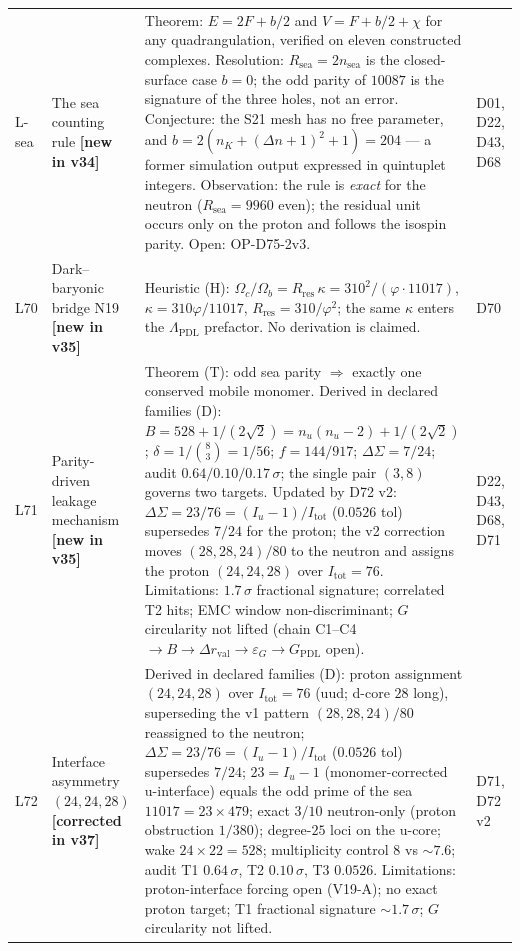 \documentclass[11pt,a4paper]{article}
\newcommand{\Rsea}{R_{\mathrm{sea}}}
\theoremstyle{plain}
\theoremstyle{definition}
\theoremstyle{remark}
\begin{document}
\begin{longtable}{L{0.6cm}L{3.0cm}L{5.5cm}L{4.0cm}}
L-sea & The sea counting rule \textbf{[new in v34]} & \textcolor{proofblue}{Theorem}: $E=2F+b/2$ and $V=F+b/2+\chi$ for any quadrangulation, verified on eleven constructed complexes. \textcolor{proofblue}{Resolution}: $\Rsea=2n_{\mathrm{sea}}$ is the closed-surface case $b=0$; the odd parity of $10087$ is the signature of the three holes, not an error. \textcolor{conjecturegreen}{Conjecture}: the S21 mesh has no free parameter, and $b=2(n_K+(\Delta n+1)^2+1)=204$ --- a former simulation output expressed in quintuplet integers. \textcolor{proofblue}{Observation}: the rule is \emph{exact} for the neutron ($\Rsea=9960$ even); the residual unit occurs only on the proton and follows the isospin parity. Open: OP-D75-2v3. & D01, D22, D43, D68\\[0.3em]
L70 & Dark--baryonic bridge N19 \textbf{[new in v35]} & \textcolor{hypothesisorange}{Heuristic (H)}: $\Omega_{c}/\Omega_{b}=R_{\mathrm{res}}\,\kappa=310^{2}/(\varphi\cdot11017)$, $\kappa=310\varphi/11017$, $R_{\mathrm{res}}=310/\varphi^{2}$; the same $\kappa$ enters the $\Lambda_{\mathrm{PDL}}$ prefactor. No derivation is claimed. & D70\\[0.3em]
L71 & Parity-driven leakage mechanism \textbf{[new in v35]} & \textcolor{proofblue}{Theorem (T)}: odd sea parity $\Rightarrow$ exactly one conserved mobile monomer. \textcolor{proofblue}{Derived in declared families (D)}: $B=528+1/(2\sqrt{2})=n_{u}(n_{u}-2)+1/(2\sqrt{2})$; $\delta=1/\binom{8}{3}=1/56$; $f=144/917$; $\Delta\Sigma=7/24$; audit $0.64/0.10/0.17\,\sigma$; the single pair $(3,8)$ governs two targets. \textcolor{negativered}{Updated by D72 v2}: $\Delta\Sigma=23/76=(I_u-1)/I_{\mathrm{tot}}$ ($0.0526$ tol) supersedes $7/24$ for the proton; the v2 correction moves $(28,28,24)/80$ to the neutron and assigns the proton $(24,24,28)$ over $I_{\mathrm{tot}}=76$. \textcolor{negativered}{Limitations}: $1.7\,\sigma$ fractional signature; correlated T2 hits; EMC window non-discriminant; $G$ circularity not lifted (chain C1--C4 $\to B\to\Delta r_{\mathrm{val}}\to\varepsilon_{G}\to G_{\mathrm{PDL}}$ open). & D22, D43, D68, D71\\[0.3em]
L72 & Interface asymmetry $(24,24,28)$ \textbf{[corrected in v37]} & \textcolor{proofblue}{Derived in declared families (D)}: proton assignment $(24,24,28)$ over $I_{\mathrm{tot}}=76$ (uud; d-core $28$ long), superseding the v1 pattern $(28,28,24)/80$ reassigned to the neutron; $\Delta\Sigma=23/76=(I_u-1)/I_{\mathrm{tot}}$ ($0.0526$ tol) supersedes $7/24$; $23=I_u-1$ (monomer-corrected u-interface) equals the odd prime of the sea $11017=23\times479$; exact $3/10$ neutron-only (proton obstruction $1/380$); degree-$25$ loci on the u-core; wake $24\times22=528$; multiplicity control $8$ vs $\sim7.6$; audit T1 $0.64\,\sigma$, T2 $0.10\,\sigma$, T3 $0.0526$. \textcolor{negativered}{Limitations}: proton-interface forcing open (V19-A); no exact proton target; T1 fractional signature $\sim1.7\,\sigma$; $G$ circularity not lifted. & D71, D72 v2\\[0.3em]

\end{longtable}
\end{document}

